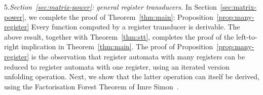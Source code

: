 \smallskip
    5.\emph{Section~\ref{sec:matrix-power}: general register transducers.}  In Section~\ref{sec:matrix-power}, we complete the proof of Theorem~\ref{thm:main}:
    \announce
    {Proposition~\ref{prop:many-register}}
    {Every function computed by a register transducer is derivable.}
    The above result, together with Theorem~\ref{thm:stt}, completes the proof of the left-to-right implication in Theorem~\ref{thm:main}. The proof of Proposition~\ref{prop:many-register} is the observation that register automata with many registers can be reduced to register automata with one register, using an iterated version unfolding operation. Next, we show that the latter operation can itself be derived, using  the Factorisation Forest Theorem of Imre Simon~\cite{simon_factorization_1990}.
